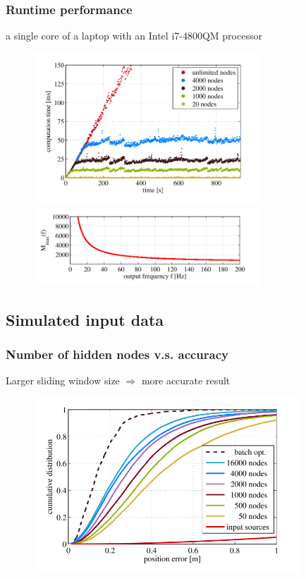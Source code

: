\documentclass[letterpaper,10pt]{article}
\begin{document}
\subsubsection{Runtime performance}
a single core of a laptop with an Intel i7-4800QM processor
\begin{figure}[!ht]
	\centering
	\includegraphics[width=8.5cm]{./img/runtime.png}
	\includegraphics[width=8.5cm]{./img/relationship.png}
\end{figure}

\subsection{Simulated input data}

\subsubsection{Number of hidden nodes v.s. accuracy}
Larger sliding window size $\Rightarrow$ more accurate result
\begin{figure}[!ht]
	\centering
	\includegraphics[width=10cm]{./img/accuracy.png}
\end{figure}
\end{document}
